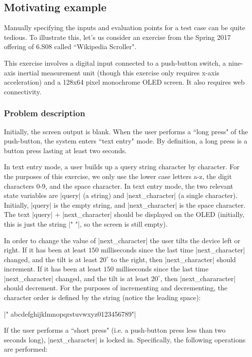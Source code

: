 \documentclass[12pt]{article}
\begin{document}
\subsection{Motivating example}
Manually specifying the inputs and evaluation points for a test case can be quite tedious.  To illustrate this, let's us consider an exercise from the Spring 2017 offering of 6.S08 called ``Wikipedia Scroller".

This exercise involves a digital input connected to a push-button switch, a nine-axis inertial measurement unit (though this exercise only requires x-axis acceleration) and a 128x64 pixel monochrome OLED screen.  It also requires web connectivity.

\subsubsection{Problem description}

Initially, the screen output is blank.  When the user performs a ``long press" of the push-button, the system enters ``text entry" mode.  By definition, a long press is a button press lasting at least two seconds.

In text entry mode, a user builds up a query string character by character.  For the purposes of this exercise, we only use the lower case letters a-z, the digit characters 0-9, and the space character.  In text entry mode, the two relevant state variables are |query| (a string) and |next_character| (a single character).  Initially, |query| is the empty string, and |next_character| is the space character.  The text |query| + |next_character| should be displayed on the OLED (initially, this is just the string |" "|, so the screen is still empty).

In order to change the value of |next_character| the user tilts the device left or right.  If it has been at least $150$ milliseconds since the last time |next_character| changed, and the tilt is at least $20^{\circ}$ to the right, then |next_character| should increment.  If it has been at least $150$ milliseconds since the last time |next_character| changed, and the tilt is at least $20^{\circ}$, then |next_chararacter| should decrement.  For the purposes of incrementing and decrementing, the character order is defined by the string (notice the leading space):

|" abcdefghijklmnopqrstuvwxyz0123456789"|

If the user performs a ``short press" (i.e. a push-button press less than two seconds long), |next_character| is locked in.  Specifically, the following operations are performed:
\end{document}
